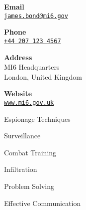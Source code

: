 \documentclass{article}
\begin{document}
\cvsidebar %



\begin{cvitem}[Envelope][4]
    \textbf{Email}\\
    \href{mailto:james.bond@mi6.gov}{\texttt{james.bond@mi6.gov}}
\end{cvitem}

\cvseparator[3]
\begin{cvitem}[Phone][4]
    \textbf{Phone}\\
    \href{tel:+442071234567}{\texttt{+44 207 123 4567}}
\end{cvitem}

\cvseparator[3]
\begin{cvitem}[Home][4]
    \textbf{Address}\\
    MI6 Headquarters\\ London, United Kingdom
\end{cvitem}

\cvseparator[3]
\begin{cvitem}[Globe][4]
    \textbf{Website}\\
    \href{https://www.mi6.gov.uk}{\texttt{www.mi6.gov.uk}}
\end{cvitem}



\begin{cvitem}
    Espionage Techniques
\end{cvitem}

\cvseparator
\begin{cvitem}
    Surveillance
\end{cvitem}

\cvseparator
\begin{cvitem}
    Combat Training
\end{cvitem}

\cvseparator
\begin{cvitem}
    Infiltration
\end{cvitem}

\cvseparator
\begin{cvitem}
    Problem Solving
\end{cvitem}

\cvseparator
\begin{cvitem}
    Effective Communication
\end{cvitem}
\end{document}
